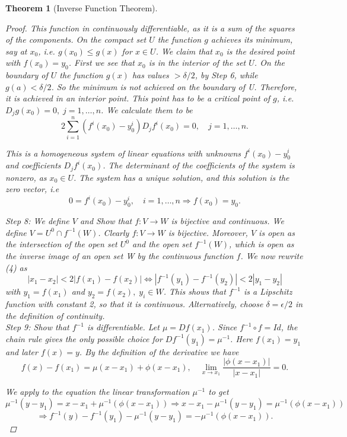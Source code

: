 \documentclass[11pt]{article}
\newtheorem{theorem}{Theorem}[section]
\begin{document}
\begin{theorem}[Inverse Function Theorem]
\begin{proof}
This function in continuously differentiable, as it is a sum of the squares of the components.
On the compact set $U$ the function $g$ achieves its minimum, say at $x_0$, i.e. $g(x_0) \leq g(x)$ for
$x \in U$. We claim that $x_0$ is the desired point with $f(x_0) = y_0$. First we see that $x_0$ is in the
interior of the set $U$. On the boundary of $U$ the function $g(x)$ has values $> \delta /2$, by Step 6,
while $g(a) < \delta /2$. So the minimum is not achieved on the boundary of U. Therefore, it is
achieved in an interior point. This point has to be a critical point of $g$, i.e. $D_j g(x_0) = 0,
\; j = 1, \dots , n$. We calculate them to be
\[ 2 \sum^{n}_{i=1}(f^i (x_0) - y^{i}_{0})D_{j}f^{i}(x_0) = 0, \quad j=1, \dots , n.\]

This is a homogeneous system of linear equations with unknowns $f^{i}(x_0) - y^{i}_{0}$ and coefficients $D_j f^{i}(x_0)$. The determinant of the coefficients of the system is nonzero, as $x_0 \in U$. The system has a unique solution, and this solution is the zero vector, i.e
\[ 0 = f^{i}(x_0) - y^{i}_{0}, \quad i=1, \dots, n \Rightarrow f(x_0) = y_{0}. \]

\textit{Step 8:} We define $V$ and Show that $f:V \rightarrow W$ is bijective and continuous. We define $V = U^0 \cap f^{-1} (W)$. Clearly $f : V \rightarrow W$ is bijective. Moreover, $V$ is open as the intersection of the open set $U^0$
and the open set $f^{-1} (W)$, which is open as the inverse image of an open set W by the continuous function $f$. We now rewrite (4) as
\begin{equation}
|x_1 - x_2 | < 2| f(x_1) - f(x_2)| \Leftrightarrow |f^{-1}(y_1)- f^{-1}(y_2)| < 2|y_1 - y_2 |
\end{equation}
with $y_1 = f(x_1)$ and $y_2 = f(x_2),\; y_i \in W$. This shows that $f^{-1}$ is a Lipschitz function with constant 2, so that it is continuous. Alternatively, choose $\delta = \epsilon /2$ in the definition of continuity.\\

\textit{Step 9:}  Show that $f^{-1}$ is differentiable. Let $\mu = Df(x_1)$. Since $f^{-1} \circ f = Id$, the chain
rule gives the only possible choice for $Df^{-1}(y_1)= \mu^{-1}$. Here $f(x_1) = y_1$ and later $f(x) = y$.
By the definition of the derivative we have
\[ f(x) - f(x_1) = \mu (x-x_1) + \phi(x-x_1), \quad \lim_{x \rightarrow x_1}\frac{|\phi(x - x_1)|}{|x - x_1|} = 0.\]

We apply to the equation the linear transformation $\mu^{-1}$ to get
\[ \mu^{-1}(y-y_1) = x - x_1 + \mu^{-1}(\phi(x - x_1)) \Rightarrow x - x_1 -\mu^{-1}(y-y_1) = \mu^{-1}(\phi(x - x_1)) \]
\[ \Rightarrow f^{-1}(y) - f^{-1}(y_1) - \mu^{-1}(y - y_1) = -\mu^{-1}(\phi(x-x_1)). \]


\end{proof}
\end{theorem}
\end{document}
